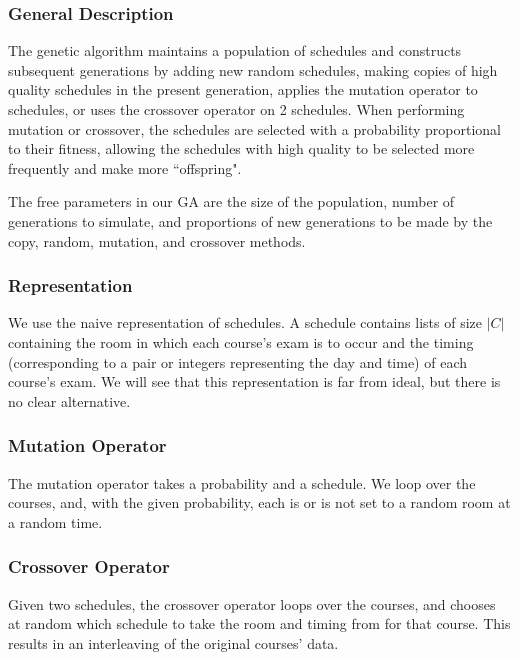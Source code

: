 \documentclass[letterpaper]{article}
\begin{document}
    \subsubsection{General Description}
      The genetic algorithm maintains a population of schedules and constructs subsequent 
      generations by adding new random schedules, making copies of high quality schedules 
      in the present generation, applies the mutation operator to schedules, or uses the 
      crossover operator on 2 schedules. When performing mutation or crossover, the 
      schedules are selected with a probability proportional to their fitness, allowing 
      the schedules with high quality to be selected more frequently and make more 
      ``offspring".
      
      The free parameters in our GA are the size of the population, number of generations 
      to simulate, and proportions of new generations to be made by the copy, random, 
      mutation, and crossover methods.
            
    \subsubsection{Representation}
      We use the naive representation of schedules. A schedule contains lists of size $|C|$
      containing the room in which each course's exam is to occur and the timing
      (corresponding to a pair or integers representing the day and time) of each course's
      exam. We will see that this representation is far from ideal, but there is no clear 
      alternative.
            
    \subsubsection{Mutation Operator}
      The mutation operator takes a probability and a schedule. We loop over the courses,
      and, with the given probability, each is or is not set to a random room at a random time.
      
    \subsubsection{Crossover Operator}
      Given two schedules, the crossover operator loops over the courses, and chooses at
      random which schedule to take the room and timing from for that course. This results 
      in an interleaving of the original courses' data.
      
\end{document}
